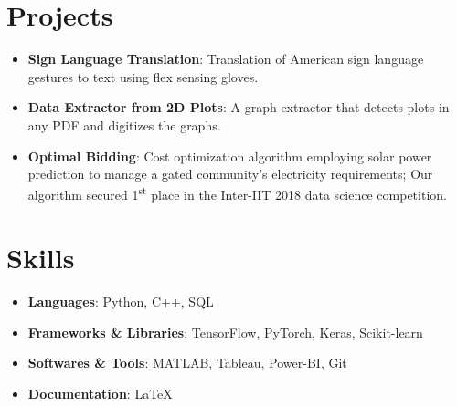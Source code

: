 \documentclass[letterpaper,11pt]{article}
\newcommand{\resumeItem}[2]{
  \item\small{
    \textbf{#1}{: #2 \vspace{-3pt}}
  }
}
\newcommand{\resumeSubItem}[2]{\resumeItem{#1}{#2}\vspace{-5pt}}
\newcommand{\resumeSubHeadingListStart}{\begin{itemize}[leftmargin=*]}
\newcommand{\resumeSubHeadingListEnd}{\end{itemize}\vspace{-16pt}}
\begin{document}
\section{Projects}
  \resumeSubHeadingListStart
    \resumeSubItem{Sign Language Translation}
      {Translation of American sign language gestures to text using flex sensing gloves.}
    \resumeSubItem{Data Extractor from 2D Plots}
      {A graph extractor that detects plots in any PDF and digitizes the graphs.}
    \resumeSubItem{Optimal Bidding}
      {Cost optimization algorithm employing solar power prediction to manage a gated community's electricity requirements; Our algorithm secured 1\textsuperscript{st} place in the Inter-IIT 2018 data science competition.}
  \resumeSubHeadingListEnd



%


\section{Skills}
 \resumeSubHeadingListStart
    \resumeSubItem{Languages}{Python, C++, SQL}
    \resumeSubItem{Frameworks \& Libraries}{TensorFlow, PyTorch, Keras, Scikit-learn}
    \resumeSubItem{Softwares \& Tools}{MATLAB, Tableau, Power-BI, Git}
    \resumeSubItem{Documentation}{\LaTeX}
 \resumeSubHeadingListEnd





\end{document}
